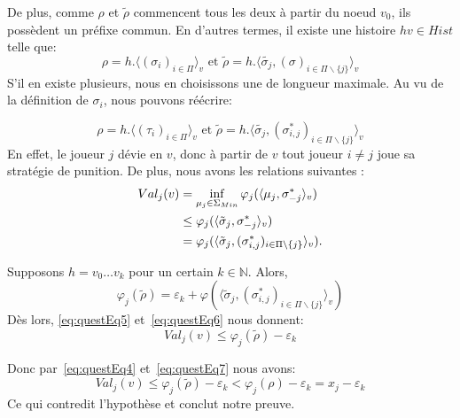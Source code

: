 \begin{demonstration}
\begin{itemize}
		De plus, comme $\rho$ et $\tilde{\rho}$ commencent tous les deux à partir du noeud $v_0$, ils possèdent un préfixe commun. En d'autres termes, il existe une histoire $hv \in Hist$ telle que: 
		\begin{equation*}
			\rho = h. \langle (\sigma_i)_{i\in\Pi} \rangle_v \text{ et } \tilde{\rho} =  h.\langle \tilde{\sigma_j}, (\sigma)_{i\in\Pi\backslash \{ j \}} \rangle_v
		\end{equation*}
		 S'il en existe plusieurs, nous en choisissons une de longueur maximale.
		Au vu de la définition de $\sigma_i$, nous pouvons réécrire:
		
		\begin{equation*}
			\rho = h. \langle (\tau_i)_{i\in\Pi} \rangle_v \text{ et } \tilde{\rho} = h.\langle \tilde{\sigma_j}, (\sigma^*_{i,j})_{i\in\Pi \backslash\{ j \} }\rangle_v
		\end{equation*}
		En effet, le joueur $j$ dévie en $v$, donc à partir de $v$ tout joueur $i \neq j$ joue sa stratégie de punition. De plus, nous avons les relations suivantes : 
		\begin{align}
			Val_j(v) &= \inf_{\mu_j\in\Sigma_{Min}}\varphi_j(\langle \mu_j, \sigma^*_{-j}\rangle_v)\notag\\
					 &\leq \varphi_j(\langle \tilde{\sigma}_j, \sigma^*_{-j}\rangle_v)\notag\\
					& = \varphi_j(\langle \tilde{\sigma}_j, (\sigma^*_{i,j})_{i \in \Pi \backslash \{ j \}}\rangle_v). \label{eq:questEq5}
		\end{align}
		
	Supposons $h = v_0 \ldots v_k$ pour un certain $k \in \mathbb{N}$. Alors,
	\begin{equation}
		\label{eq:questEq6}
		\varphi_j(\tilde{\rho}) = \varepsilon_k + \varphi(\langle \tilde{\sigma}_j , (\sigma^*_{i,j})_{i\in\Pi\backslash\{ j \}}\rangle_v)
	\end{equation}
	Dès lors, \eqref{eq:questEq5} et~\eqref{eq:questEq6} nous donnent:
	\begin{equation}
		\label{eq:questEq7}
		Val_j(v) \leq \varphi_j(\tilde{\rho}) - \varepsilon_k
	\end{equation}
	
	Donc par~\eqref{eq:questEq4} et~\eqref{eq:questEq7}  nous avons:
	$$ Val_j(v) \leq \varphi_j(\tilde{\rho})- \varepsilon_k < \varphi_j(\rho)-\varepsilon_k = x_j-\varepsilon_k$$
	Ce qui contredit l'hypothèse et conclut notre preuve.
	\end{itemize}
\end{demonstration}


